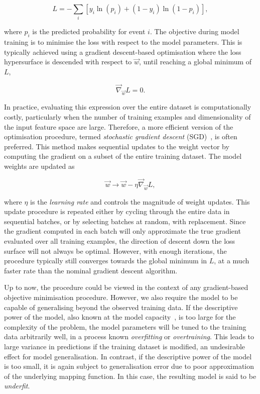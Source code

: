 \begin{equation}\label{eqn:cross_entropy}
L = -\sum_{i}[y_{i}\ln(p_{i}) + (1-y_{i})\ln(1-p_{i})],
\end{equation}


\noindent where $p_{i}$ is the predicted probability for event $i$. The objective during model training is to minimise the loss with respect to the model parameters. This is typically achieved using a gradient descent-based optimisation where the loss hypersurface is descended with respect to $\vec{w}$, until reaching a global minimum of $L$,

$$\vec{\nabla}_{\vec{w}}L = 0.$$

\noindent In practice, evaluating this expression over the entire dataset is computationally costly, particularly when the number of training examples and dimensionality of the input feature space are large. Therefore, a more efficient version of the optimisation procedure, termed \textit{stochastic gradient descent} (SGD)~\cite{backprop}, is often preferred. This method makes sequential updates to the weight vector by computing the gradient on a subset of the entire training dataset. The model weights are updated as

$$\vec{w}\rightarrow \vec{w}-\eta\vec{\nabla}_{\vec{w}}L,$$

\noindent where $\eta$ is the \textit{learning rate} and controls the magnitude of weight updates. This update procedure is repeated either by cycling through the entire data in sequential batches, or by selecting batches at random, with replacement. 
Since the gradient computed in each batch will only approximate the true gradient evaluated over all training examples, the direction of descent down the loss surface will not always be optimal. However, with enough iterations, the procedure typically still converges towards the global minimum in $L$, at a much faster rate than the nominal gradient descent algorithm.

Up to now, the procedure could be viewed in the context of any gradient-based objective minimisation procedure. However, we also require the model to be capable of generalising beyond the observed training data. If the descriptive power of the model, also known at the model capacity~\cite{deep_learning}, is too large for the complexity of the problem, the model parameters will be tuned to the training data arbitrarily well, in a process known \textit{overfitting} or \textit{overtraining}. This leads to large variance in predictions if the training dataset is modified, an undesirable effect for model generalisation.
In contrast, if the descriptive power of the model is too small, it is again subject to generalisation error due to poor approximation of the underlying mapping function. In this case, the resulting model is said to be \textit{underfit}. 


